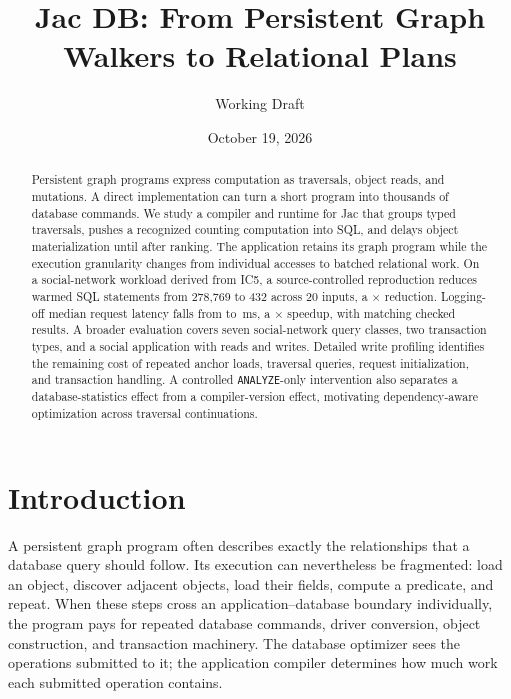 \documentclass[sigconf,nonacm]{acmart}
\title{Jac DB: From Persistent Graph Walkers to Relational Plans}
\author{Working Draft}
\date{October 19, 2026}
\newcommand{\code}[1]{\texttt{#1}}
\begin{document}
\begin{abstract}
Persistent graph programs express computation as traversals, object reads,
and mutations. A direct implementation can turn a short program into thousands
of database commands. We study a compiler and runtime for Jac that groups
typed traversals, pushes a recognized counting computation into SQL, and delays
object materialization until after ranking. The application retains its graph
program while the execution granularity changes from individual accesses to
batched relational work. On a social-network workload derived from IC5, a
source-controlled reproduction reduces warmed SQL statements from 278,769 to
432 across 20 inputs, a \SQLReduction{}$\times$ reduction. Logging-off median
request latency falls from \BaseLatency{} to \FinalLatency{}\,ms,
a \LatencySpeedup{}$\times$ speedup, with matching checked results. A broader
evaluation covers seven social-network query classes, two transaction types,
and a social application with reads and writes. Detailed write profiling
identifies the remaining cost of repeated anchor loads, traversal queries,
request initialization, and transaction handling. A controlled
\code{ANALYZE}-only intervention also separates a database-statistics effect
from a compiler-version effect, motivating dependency-aware optimization
across traversal continuations.
\end{abstract}

\maketitle

\vldbtopmatter

\section{Introduction}
\label{sec:introduction}

A persistent graph program often describes exactly the relationships that a
database query should follow. Its execution can nevertheless be fragmented:
load an object, discover adjacent objects, load their fields, compute a
predicate, and repeat. When these steps cross an application--database
boundary individually, the program pays for repeated database commands,
driver conversion, object construction, and transaction machinery. The
database optimizer sees the operations submitted to it; the application
compiler determines how much work each submitted operation contains.
\end{document}
